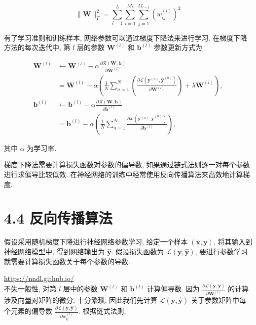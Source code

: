 \documentclass[10pt]{article}
\begin{document}
\begin{equation*}
\|\boldsymbol{W}\|_{F}^{2}=\sum_{l=1}^{L} \sum_{i=1}^{M_{l}} \sum_{j=1}^{M_{l-1}}\left(w_{i j}^{(l)}\right)^{2} \tag{4.44}
\end{equation*}


有了学习准则和训练样本, 网络参数可以通过梯度下降法来进行学习. 在梯度下降方法的每次迭代中, 第 $l$ 层的参数 $\boldsymbol{W}^{(l)}$ 和 $\boldsymbol{b}^{(l)}$ 参数更新方式为


\begin{align*}
\boldsymbol{W}^{(l)} & \leftarrow \boldsymbol{W}^{(l)}-\alpha \frac{\partial \mathcal{R}(\boldsymbol{W}, \boldsymbol{b})}{\partial \boldsymbol{W}^{(l)}}  \tag{4.45}\\
& =\boldsymbol{W}^{(l)}-\alpha\left(\frac{1}{N} \sum_{n=1}^{N}\left(\frac{\partial \mathcal{L}\left(\boldsymbol{y}^{(n)}, \hat{\boldsymbol{y}}^{(n)}\right)}{\partial \boldsymbol{W}^{(l)}}\right)+\lambda \boldsymbol{W}^{(l)}\right),  \tag{4.46}\\
\boldsymbol{b}^{(l)} & \leftarrow \boldsymbol{b}^{(l)}-\alpha \frac{\partial \mathcal{R}(\boldsymbol{W}, \boldsymbol{b})}{\partial \boldsymbol{b}^{(l)}}  \tag{4.47}\\
& =\boldsymbol{b}^{(l)}-\alpha\left(\frac{1}{N} \sum_{n=1}^{N} \frac{\partial \mathcal{L}\left(\boldsymbol{y}^{(n)}, \hat{\boldsymbol{y}}^{(n)}\right)}{\partial \boldsymbol{b}^{(l)}}\right), \tag{4.48}
\end{align*}


其中 $\alpha$ 为学习率.

梯度下降法需要计算损失函数对参数的偏导数, 如果通过链式法则逐一对每个参数进行求偏导比较低效. 在神经网络的训练中经常使用反向传播算法来高效地计算梯度.

\section*{4.4 反向传播算法}
假设采用随机梯度下降进行神经网络参数学习, 给定一个样本 $(\boldsymbol{x}, \boldsymbol{y})$, 将其输入到神经网络模型中, 得到网络输出为 $\hat{\boldsymbol{y}}$. 假设损失函数为 $\mathcal{L}(\boldsymbol{y}, \hat{\boldsymbol{y}})$, 要进行参数学习就需要计算损失函数关于每个参数的导数.

\href{https://nndl.github.io/}{https://nndl.github.io/}\\
不失一般性, 对第 $l$ 层中的参数 $\boldsymbol{W}^{(l)}$ 和 $\boldsymbol{b}^{(l)}$ 计算偏导数. 因为 $\frac{\partial \mathcal{L}(\boldsymbol{y}, \hat{\boldsymbol{y}})}{\partial \boldsymbol{W}^{(l)}}$ 的计算涉及向量对矩阵的微分, 十分繁琐, 因此我们先计算 $\mathcal{L}(\boldsymbol{y}, \hat{\boldsymbol{y}})$ 关于参数矩阵中每个元素的偏导数 $\frac{\partial \mathcal{L}(\boldsymbol{y}, \hat{\boldsymbol{y}})}{\partial w_{i j}^{(l)}}$. 根据链式法则,
\end{document}
